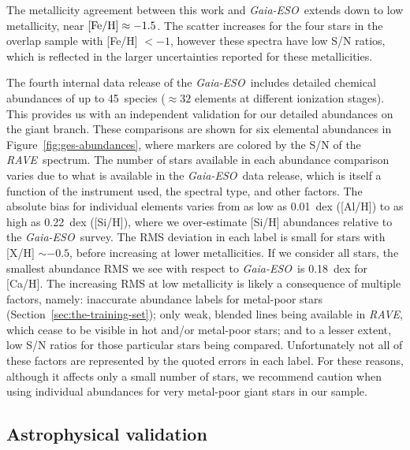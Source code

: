 \documentclass[preprint,trackchanges]{aastex}
\newcommand{\acronym}[1]{{\small{#1}}}
\newcommand{\project}[1]{\textsl{#1}}
\newcommand{\rave}{\project{\acronym{RAVE}}}
\newcommand{\ges}{\project{Gaia-ESO}}
\begin{document}
The metallicity agreement between this work and \ges\ extends down to low
metallicity, near $[{\rm Fe/H}] \approx -1.5$.  The scatter increases for
the four stars in the overlap sample with [Fe/H] $< -1$, however these
spectra have low S/N ratios, which is reflected in the larger uncertainties
reported for these metallicities.


The fourth internal data release of the \ges\ includes detailed chemical
abundances of up to 45~species ($\approx32$ elements at different ionization
stages).  This provides us with an independent validation for our detailed
abundances on the giant branch.  These comparisons are shown for six elemental
abundances in Figure~\ref{fig:ges-abundances}, where markers are colored by the
S/N of the \rave\ spectrum.  The number of stars available in each abundance
comparison varies due to what is available in the \ges\ data release, which
is itself a function of the instrument used, the spectral type, and other
factors.  The absolute bias for individual elements varies from as low as
0.01~dex ([Al/H]) to as high as 0.22~dex ([Si/H]), where we over-estimate 
[Si/H] abundances relative to the \ges\ survey. The RMS deviation in each
label is small for stars with [X/H] $\sim -0.5$, before increasing at lower
metallicities.  If we consider all stars, the smallest abundance RMS we see
with respect to \ges\ is 0.18~dex for [Ca/H].  The increasing RMS at low 
metallicity is likely a consequence of multiple factors, namely: inaccurate
abundance labels for metal-poor stars (Section~\ref{sec:the-training-set});
only weak, blended lines being available in \rave, which cease to be visible
in hot and/or metal-poor stars; and to a lesser extent, low S/N ratios for 
those particular stars being compared.  Unfortunately not all of these
factors are represented by the quoted errors in each label.  For these reasons, 
although it affects only a small number of stars, we recommend caution when 
using individual abundances for very metal-poor giant stars in our sample.

\subsection{Astrophysical validation}
\label{sec:astrophysical-validation}
\end{document}
